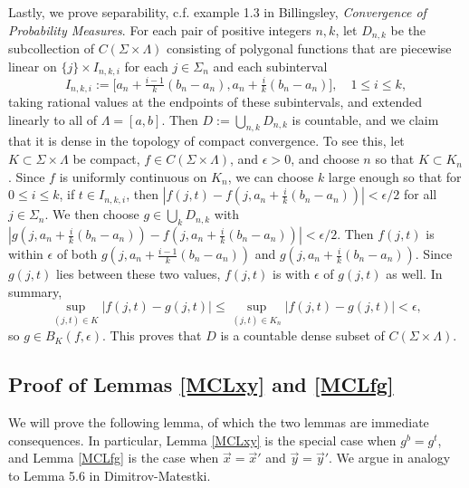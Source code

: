 Lastly, we prove separability, c.f. example 1.3 in Billingsley, \textit{Convergence of Probability Measures}. For each pair of positive integers $n,k$, let $D_{n,k}$ be the subcollection of $C(\Sigma\times\Lambda)$ consisting of polygonal functions that are piecewise linear on $\{j\}\times I_{n,k,i}$ for each $j\in\Sigma_n$ and each subinterval 
\[
I_{n,k,i} := \big[a_n+\tfrac{i-1}{k}(b_n-a_n), a_n+\tfrac{i}{k}(b_n-a_n)\big], \quad 1\leq i\leq k,
\] 
taking rational values at the endpoints of these subintervals, and extended linearly to all of $\Lambda = [a,b]$. Then $D := \bigcup_{n,k} D_{n,k}$ is countable, and we claim that it is dense in the topology of compact convergence. To see this, let $K\subset\Sigma\times\Lambda$ be compact, $f\in C(\Sigma\times\Lambda)$, and $\epsilon>0$, and choose $n$ so that $K\subset K_n$. Since $f$ is uniformly continuous on $K_n$, we can choose $k$ large enough so that for $0\leq i\leq k$, if $t\in I_{n,k,i}$, then $|f(j,t) - f(j, a_n + \frac{i}{k}(b_n-a_n))| < \epsilon/2$ for all $j\in\Sigma_n$. We then choose $g\in \bigcup_k D_{n,k}$ with $|g(j,a_n + \frac{i}{k}(b_n-a_n)) - f(j,a_n + \frac{i}{k}(b_n-a_n))| < \epsilon/2$. Then $f(j,t)$ is within $\epsilon$ of both $g(j,a_n + \frac{i-1}{k}(b_n-a_n))$ and $g(j,a_n + \frac{i}{k}(b_n-a_n))$. Since $g(j,t)$ lies between these two values, $f(j,t)$ is with $\epsilon$ of $g(j,t)$ as well. In summary,
\[
\sup_{(j,t)\in K} |f(j,t)-g(j,t)| \leq \sup_{(j,t)\in K_n} |f(j,t)-g(j,t)| < \epsilon,
\] 
so $g\in B_K(f,\epsilon)$. This proves that $D$ is a countable dense subset of $C(\Sigma\times\Lambda)$.


\subsection{Proof of Lemmas \ref{MCLxy} and \ref{MCLfg}}

We will prove the following lemma, of which the two lemmas are immediate consequences. In particular, Lemma \ref{MCLxy} is the special case when $g^b = g^t$, and Lemma \ref{MCLfg} is the case when $\vec{x} = \vec{x}'$ and $\vec{y} = \vec{y}'$. We argue in analogy to Lemma 5.6 in Dimitrov-Matestki.

